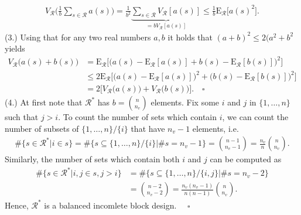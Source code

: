 \documentclass[Research_Module_ES.tex]{subfiles}
\begin{document}
\begin{align*}
V_\mathcal{R} \biggl(\frac{1}{b}\sum_{s\in \mathcal{R}}a(s)\biggr)
= \frac{1}{b^2}\underbrace{\sum_{s\in \mathcal{R}}V_\mathcal{R} [a(s)]}_{=bV_\mathcal{R} [a(s)]}
\le \frac{1}{b}\mathrm{E}_\mathcal{R}\bigl[a(s)^2\bigr].
\end{align*}
(3.) Using that for any two real numbers $a,b$ it holds that $(a+b)^2\le 2(a^2+b^2$ yields
\begin{align*}
V_\mathcal{R}\bigl(a(s)+b(s)\bigr) 
&= \mathrm{E}_\mathcal{R}\bigl[\bigl(a(s)-\mathrm{E}_\mathcal{R}[a(s)] + b(s) - \mathrm{E}_\mathcal{R}[b(s)]\bigr)^2\bigr]\\
&\le 2 \mathrm{E}_\mathcal{R}\bigl[\bigl(a(s)-\mathrm{E}_\mathcal{R}[a(s)] \bigr)^2+\bigl(b(s) - \mathrm{E}_\mathcal{R}[b(s)]\bigr)^2\bigr]\\
&= 2\bigl[V_\mathcal{R}\bigl(a(s)\bigr)+V_\mathcal{R}\bigl(b(s)\bigr)\bigr]. \quad \square
\end{align*}
(4.) At first note that $\mathcal{R}^\ast$ has $b=\binom{n}{n_v}$ elements. Fix some $i$ and $j$ in $\{1,\dots, n\}$ such that $j>i$. To count the number of sets which contain $i$, we can count the number of subsets of $\{1,\dots, n\}/\{i\}$ that have $n_v-1$ elements, i.e.
\begin{align*}
\#\{s\in \mathcal{R}^\ast|i\in s\} = \#\{s \subseteq \{1,\dots, n\}/\{i\} | \# s =n_v-1\} = \binom{n-1}{n_v-1} =\frac{n_v}{n}\binom{n}{n_v}.
\end{align*}
Similarly, the number of sets which contain both $i$ and $j$ can be computed as
\begin{align*}
\#\{s\in \mathcal{R}^\ast|i,j\in s , j>i\} &= \#\{s \subseteq \{1,\dots, n\}/\{i,j\} | \# s =n_v-2\} \\
&= \binom{n-2}{n_v-2} = \frac{n_v(n_v-1)}{n(n-1)}\binom{n}{n_v}.
\end{align*}
Hence, $\mathcal{R}^\ast$ is a balanced incomlete block design. $\quad\square$
\end{document}
